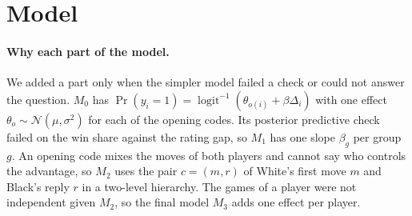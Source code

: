 \documentclass[12pt]{article}
\newcommand{\logistic}{\operatorname{logit}^{-1}}
\newcommand{\Normal}{\mathcal{N}}
\begin{document}
\section{Model}\label{sec:model}

\paragraph{Why each part of the model.} We added a part only when the simpler model failed a check or could not answer the question. $M_0$ has $\Pr(y_i = 1) = \logistic(\theta_{o(i)} + \beta \Delta_i)$ with one effect $\theta_o \sim \Normal(\mu, \sigma^2)$ for each of the \nOpenings{} opening codes. Its posterior predictive check failed on the win share against the rating gap, so $M_1$ has one slope $\beta_g$ per group $g$. An opening code mixes the moves of both players and cannot say who controls the advantage, so $M_2$ uses the pair $c = (m, r)$ of White's first move $m$ and Black's reply $r$ in a two-level hierarchy. The games of a player were not independent given $M_2$, so the final model $M_3$ adds one effect per player.
\end{document}
